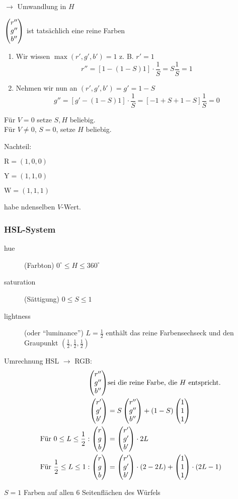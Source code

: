  $\rightarrow$ Umwandlung in $H$ 
\begin{center}
\end{center}
$\begin{pmatrix}r''\\g''\\b''\end{pmatrix}$ ist tatsächlich eine reine Farben
\begin{enumerate}
 \item Wir wissen $\max(r',g',b') = 1$ z. B. $r' = 1$
	\[r'' = [1-(1-S)1] \cdot \frac{1}{S} = S \frac{1}{S} = 1\]
 \item Nehmen wir nun an $(r',g',b') = g' = 1-S$
	\[g'' = [g'-(1-S)1] \cdot \frac{1}{S} = [-1 + S + 1 - S] \frac{1}{S} = 0\]
\end{enumerate}
Für $V = 0$ setze $S, H$ beliebig.\\
Für $V \neq 0$, $S = 0$, setze $H$ beliebig.
\begin{center}
\end{center}
Nachteil:
\begin{description}
 \item $\mathrm{R} = (1,0,0)$
 \item $\mathrm{Y} = (1,1,0)$
 \item $\mathrm{W} = (1,1,1)$
\end{description}
habe ndenselben $V$-Wert.

\subsubsection{HSL-System}
\begin{description}
 \item[hue] (Farbton) $0^\circ \le H \le 360^\circ$
 \item[saturation] (Sättigung) $0 \le S \le 1$
 \item[lightness] (oder "`luminance"') $L = \tfrac{1}{2}$ enthält das reine Farbensechseck und den Graupunkt
	$\left(\tfrac{1}{2},\tfrac{1}{2},\tfrac{1}{2}\right)$
\end{description}
\begin{center}
\end{center}
Umrechnung HSL $\to$ RGB:
\begin{align*}
 \begin{pmatrix}r''\\g''\\b''\end{pmatrix} &\text{sei die reine Farbe, die $H$ entspricht.}\\
 \begin{pmatrix}r'\\g'\\b'\end{pmatrix} &= S \begin{pmatrix}r''\\g''\\b''\end{pmatrix} + (1-S) \begin{pmatrix}1\\1\\1\end{pmatrix}\\
 \text{Für } 0 \le L \le \frac{1}{2}: \begin{pmatrix}r\\g\\b\end{pmatrix} &= \begin{pmatrix}r'\\g'\\b'\end{pmatrix} \cdot 2L\\
 \text{Für } \frac{1}{2} \le L \le 1: \begin{pmatrix}r\\g\\b\end{pmatrix} &= \begin{pmatrix}r'\\g'\\b'\end{pmatrix} \cdot (2-2L) +
			\begin{pmatrix}1\\1\\1\end{pmatrix} \cdot (2L - 1)
\end{align*}
\begin{center}
\end{center}
$S = 1$ Farben auf allen 6 Seitenflächen des Würfels




